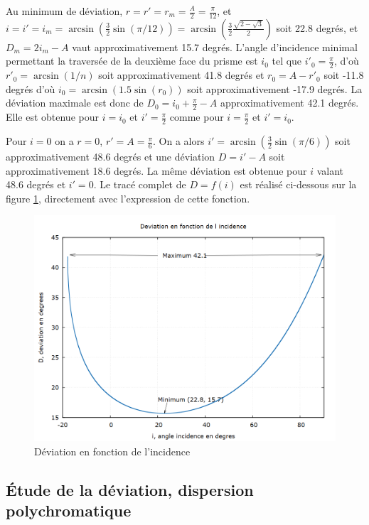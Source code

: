 Au minimum de déviation, $r=r'=r_m=\frac{A}{2}=\frac{\pi}{12}$, et $i=i'=i_m=\arcsin\left(\frac{3}{2}\sin(\pi/12)\right) = \arcsin\left(\frac{3}{2} \frac{\sqrt{2-\sqrt{3}}}{2}\right)$ soit 22.8 degrés, et $D_m=2i_m-A$ vaut approximativement 15.7 degrés.
L'angle d'incidence minimal permettant la traversée de la deuxième face du prisme est $i_0$ tel que $i'_0=\frac{\pi}{2}$, d'où $r'_0 = \arcsin(1/n)$ soit approximativement 41.8 degrés et $r_0=A-r'_0$ soit -11.8 degrés d'où $i_0=\arcsin(1.5 \sin(r_0))$ soit approximativement -17.9 degrés. La déviation maximale est donc de $D_0 = i_0 + \frac{\pi}{2}-A$ approximativement 42.1 degrés. Elle est obtenue pour $i=i_0$ et $i'=\frac{\pi}{2}$ comme pour $i=\frac{\pi}{2}$ et $i'=i_0$.

Pour $i=0$ on a $r=0$, $r'=A=\frac{\pi}{6}$. On a alors $i'=\arcsin(\frac{3}{2}\sin(\pi/6))$ soit approximativement 48.6 degrés et une déviation $D=i'-A$ soit approximativement 18.6 degrés. La même déviation est obtenue pour $i$ valant 48.6 degrés et $i'=0$.
Le tracé complet de $D=f(i)$ est réalisé ci-dessous sur la figure \ref{fig:chap6-deviation}, directement avec l'expression de cette fonction.
\begin{figure}
	\centering
	\includegraphics[width=\textwidth]{Deviation.png}
	\caption{Déviation en fonction de l'incidence}
	\label{fig:chap6-deviation}
\end{figure}
\subsection{Étude de la déviation, dispersion polychromatique}

